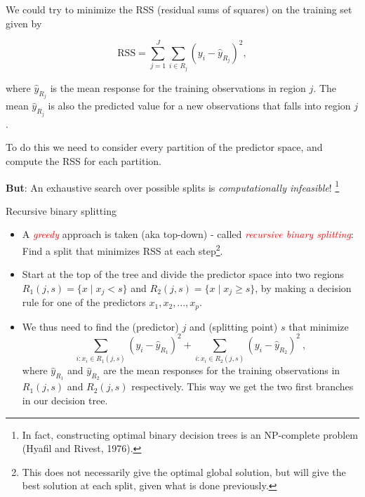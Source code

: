 \documentclass[
  10pt,
  ignorenonframetext,
]{beamer}
\providecommand{\tightlist}{%
  \setlength{\itemsep}{0pt}\setlength{\parskip}{0pt}}
\begin{document}
\begin{frame}
We could try to minimize the RSS (residual sums of squares) on the
training set given by

\[
\text{RSS}=\sum_{j=1}^J \sum_{i \in R_j}(y_i-\hat{y}_{R_j})^2,
\]

where \(\hat{y}_{R_j}\) is the mean response for the training
observations in region \(j\). The mean \(\hat{y}_{R_j}\) is also the
predicted value for a new observations that falls into region \(j\).

To do this we need to consider every partition of the predictor space,
and compute the RSS for each partition.

\textbf{But}: An exhaustive search over possible splits is
\emph{computationally infeasible}!
\footnote{In fact, constructing optimal binary decision trees is an NP-complete problem (Hyafil and Rivest, 1976).}
\end{frame}

\begin{frame}
\begin{block}{Recursive binary splitting}
\protect\hypertarget{recursive-binary-splitting}{}
\vspace{2mm}

\begin{itemize}
\tightlist
\item
  A \emph{\textcolor{red}{greedy}} approach is taken (aka top-down) -
  called \emph{\textcolor{red}{recursive binary splitting}}: Find a
  split that minimizes RSS at each
  step\footnote{This does not necessarily give the optimal global solution, but will give the best solution at each split, given what is done previously.}.
\end{itemize}

\vspace{1mm}

\begin{itemize}
\tightlist
\item
  Start at the top of the tree and divide the predictor space into two
  regions \(R_1(j,s)=\{x \mid x_j<s\}\) and
  \(R_2(j,s)=\{x \mid x_j\geq s\}\), by making a decision rule for one
  of the predictors \(x_1, x_2,...,x_p\).
\end{itemize}

\vspace{1mm}

\begin{itemize}
\tightlist
\item
  We thus need to find the (predictor) \(j\) and (splitting point) \(s\)
  that minimize
  \[\sum_{i: x_i \in R_1(j,s)}(y_i-\hat{y}_{R_1})^2+\sum_{i: x_i \in R_2(j,s)}(y_i -\hat{y}_{R_2})^2 \ ,\]
  where \(\hat{y}_{R_1}\) and \(\hat{y}_{R_2}\) are the mean responses
  for the training observations in \(R_1(j,s)\) and \(R_2(j,s)\)
  respectively. This way we get the two first branches in our decision
  tree.
\end{itemize}
\end{block}
\end{frame}
\end{document}

